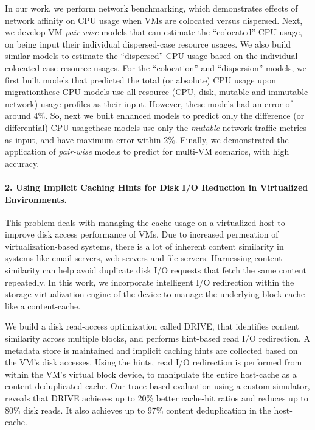 In our work, 
we perform network benchmarking, which 
demonstrates effects of network affinity on CPU usage when VMs 
are colocated versus dispersed. Next, we develop VM \textit{pair-wise} models
that can estimate the ``colocated'' CPU usage, on being 
input their individual dispersed-case resource usages.
We also build similar models to estimate the ``dispersed'' CPU
usage based on the individual colocated-case resource usages.
For the ``colocation'' and ``dispersion'' models, we first 
built models that predicted the total (or absolute) CPU usage
upon migration\textemdash{}these CPU models use all resource (CPU, disk, mutable
and immutable network) usage profiles as their input. However, these models
had an error of around 4\%. So, next we built enhanced models
to predict only the difference (or differential) CPU usage\textemdash{}these
models use only the \textit{mutable} network traffic metrics as input,
and have maximum error within 2\%. Finally, we demonstrated the
application of \textit{pair-wise} models to predict for multi-VM
scenarios, with high accuracy.

\paragraph{2. Using Implicit Caching Hints for {D}isk I/O {R}eduction in Virtualized Environments.}
This problem deals with managing the cache
usage on a virtualized host to improve disk access performance 
of VMs.
Due to increased permeation of virtualization-based systems, there is a lot of
inherent content similarity in systems like email servers, web servers 
and file servers. 
Harnessing content similarity can help 
avoid duplicate disk I/O requests that fetch the same content repeatedly.
In this work, we incorporate intelligent I/O redirection within the 
storage virtualization engine of the device to manage the underlying 
block-cache like a content-cache.

We build a disk read-access optimization called DRIVE, that
identifies content similarity across multiple blocks, and performs
hint-based read I/O redirection.
A metadata store is maintained and implicit caching hints are collected 
based on the VM's disk accesses.
Using the hints, read I/O redirection is performed from within the VM's virtual
block device, to manipulate the entire
host-cache as a content-deduplicated cache.
Our trace-based evaluation using a custom simulator, reveals that
DRIVE achieves up to 20\% better cache-hit ratios and reduces
up to 80\% disk reads. It also achieves up to 
97\% content deduplication in the host-cache.

